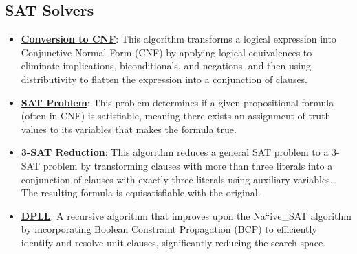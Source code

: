 \documentclass{article}%
\begin{document}
\subsection{SAT Solvers}%
\label{subsec:SATSolvers}%
\begin{itemize}[leftmargin=*]%
\item \href{https://purdue.brightspace.com/d2l/common/assets/pdfjs-d2l-dist/1.0.14-legacy/web/viewer.html?file=\%2Fcontent\%2Fenforced\%2F1095467-wl.202510.CS.24300.001\%2F13L1-Logic.pdf\%3Fou\%3D1095467\&lang=en-us\&container=d2l-fileviewer-rendered-pdf\&fullscreen=d2l-fileviewer-rendered-pdf-dialog\&height=667#page=17}{\textbf{Conversion to CNF}}: This algorithm transforms a logical expression into Conjunctive Normal Form (CNF) by applying logical equivalences to eliminate implications, biconditionals, and negations, and then using distributivity to flatten the expression into a conjunction of clauses.%
\item \href{https://purdue.brightspace.com/d2l/common/assets/pdfjs-d2l-dist/1.0.14-legacy/web/viewer.html?file=\%2Fcontent\%2Fenforced\%2F1095467-wl.202510.CS.24300.001\%2F13L1-Logic.pdf\%3Fou\%3D1095467\&lang=en-us\&container=d2l-fileviewer-rendered-pdf\&fullscreen=d2l-fileviewer-rendered-pdf-dialog\&height=667#page=15}{\textbf{SAT Problem}}: This problem determines if a given propositional formula (often in CNF) is satisfiable, meaning there exists an assignment of truth values to its variables that makes the formula true.%
\item \href{https://purdue.brightspace.com/d2l/common/assets/pdfjs-d2l-dist/1.0.14-legacy/web/viewer.html?file=\%2Fcontent\%2Fenforced\%2F1095467-wl.202510.CS.24300.001\%2F13L1-Logic.pdf\%3Fou\%3D1095467\&lang=en-us\&container=d2l-fileviewer-rendered-pdf\&fullscreen=d2l-fileviewer-rendered-pdf-dialog\&height=667#page=24}{\textbf{3-SAT Reduction}}: This algorithm reduces a general SAT problem to a 3-SAT problem by transforming clauses with more than three literals into a conjunction of clauses with exactly three literals using auxiliary variables. The resulting formula is equisatisfiable with the original.%
\item \href{https://purdue.brightspace.com/d2l/common/assets/pdfjs-d2l-dist/1.0.14-legacy/web/viewer.html?file=\%2Fcontent\%2Fenforced\%2F1095467-wl.202510.CS.24300.001\%2F15L2-SAT.pdf\%3Fou\%3D1095467\&lang=en-us\&container=d2l-fileviewer-rendered-pdf\&fullscreen=d2l-fileviewer-rendered-pdf-dialog\&height=667#page=17}{\textbf{DPLL}}: A recursive algorithm that improves upon the Na``ive_SAT algorithm by incorporating Boolean Constraint Propagation (BCP) to efficiently identify and resolve unit clauses, significantly reducing the search space.%

\end{itemize}
\end{document}
